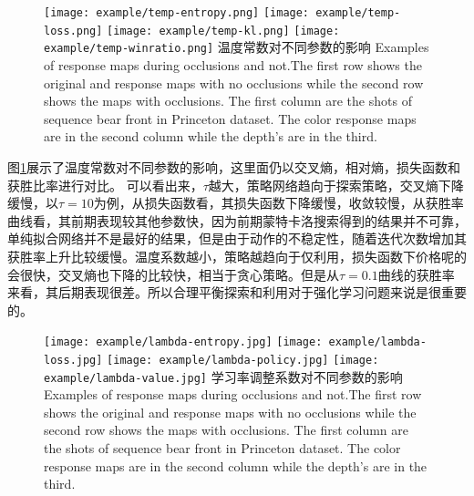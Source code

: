\begin{figure}[!bpht]
	\centering
	{\texttt{[image: example/temp-entropy.png]}}
	\hspace{0.5em}
	{\texttt{[image: example/temp-loss.png]}}
	\newline
	\centering
	{\texttt{[image: example/temp-kl.png]}}
	\hspace{0.5em}
	{\texttt{[image: example/temp-winratio.png]}}
	\bicaption
	{温度常数对不同参数的影响}
	{Examples of response maps during occlusions and not.The first row shows the original and response maps with no occlusions while the second row shows the maps with occlusions. The first column are the shots of sequence bear front in Princeton dataset. The color response maps are in the second column while the depth’s are in the third.}
	\label{fig2:response}
\end{figure}
图\ref{fig2:response}展示了温度常数对不同参数的影响，这里面仍以交叉熵，相对熵，损失函数和获胜比率进行对比。
可以看出来，$\tau$越大，策略网络趋向于探索策略，交叉熵下降缓慢，以$\tau=10$为例，从损失函数看，其损失函数下降缓慢，收敛较慢，从获胜率曲线看，其前期表现较其他参数快，因为前期蒙特卡洛搜索得到的结果并不可靠，单纯拟合网络并不是最好的结果，但是由于动作的不稳定性，随着迭代次数增加其获胜率上升比较缓慢。温度系数越小，策略越趋向于仅利用，损失函数下价格呢的会很快，交叉熵也下降的比较快，相当于贪心策略。但是从$\tau=0.1$曲线的获胜率来看，其后期表现很差。所以合理平衡探索和利用对于强化学习问题来说是很重要的。

\begin{figure}[!bpht]
	\centering
	{\texttt{[image: example/lambda-entropy.jpg]}}
	\hspace{0.5em}
	{\texttt{[image: example/lambda-loss.jpg]}}
	\newline
	\centering
	{\texttt{[image: example/lambda-policy.jpg]}}
	\hspace{0.5em}
	{\texttt{[image: example/lambda-value.jpg]}}
	\bicaption
	{学习率调整系数对不同参数的影响}
	{Examples of response maps during occlusions and not.The first row shows the original and response maps with no occlusions while the second row shows the maps with occlusions. The first column are the shots of sequence bear front in Princeton dataset. The color response maps are in the second column while the depth’s are in the third.}
	\label{fig2response}
\end{figure}

